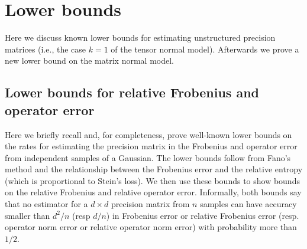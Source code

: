 \documentclass[aos]{imsart}
\theoremstyle{definition}
\numberwithin{equation}{section}
\newcommand{\CF}[1]{{\color{purple}[CF: #1]}}
\begin{document}
\section{Lower bounds}\label{sec:lower}
Here we discuss known lower bounds for estimating unstructured precision matrices (i.e., the case $k= 1$ of the tensor normal model). Afterwards we prove a new lower bound on the matrix normal model.
\subsection{Lower bounds for relative Frobenius and operator error}
Here we briefly recall and, for completeness, prove well-known lower bounds on the rates for estimating the precision matrix in the Frobenius and operator error from independent samples of a Gaussian. The lower bounds follow from Fano's method and the relationship between the Frobenius error and the relative entropy (which is proportional to Stein's loss). We then use these bounds to show bounds on the relative Frobenius and relative operator error. Informally, both bounds say that no estimator for a $d\times d$ precision matrix from $n$ samples can have accuracy smaller than $d^2/n$ (resp $d/n$) in Frobenius error or relative Frobenius error (resp. operator norm error or relative operator norm error) with probability more than $1/2$.
\end{document}
